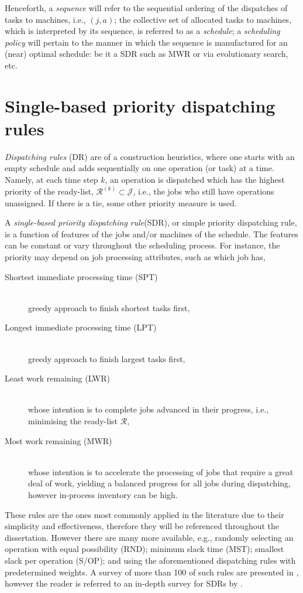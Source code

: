 Henceforth, a \emph{sequence} will refer to the sequential ordering of the dispatches of tasks to machines, i.e., $(j,a)$; the collective set of allocated tasks to machines, which is interpreted by its sequence, is referred to as a \emph{schedule}; a \emph{scheduling policy} will pertain to the manner in which the sequence is manufactured for an (near) optimal schedule: be it a SDR such as MWR or via evolutionary search, etc. 

\section{Single-based priority dispatching rules}\label{sec:SDR}
\emph{Dispatching rules} (DR) are of a construction heuristics, where one starts with an empty schedule and adds sequentially on one operation (or task) at a time. Namely, at each time step $k$, an operation is dispatched which has the highest priority of the ready-list, \mbox{$\mathcal{R}^{(k)}\subset\mathcal{J}$}, i.e., the jobs who still have operations unassigned. If there is a tie, some other priority measure is used. 

A \emph{single-based priority dispatching rule}(SDR), or simple priority dispatching rule, is a function of features of the jobs and/or machines of the schedule. The features can be constant or vary throughout the scheduling process. For instance, the priority may depend on job processing attributes, such as which job has, 
\begin{description}
\item[Shortest immediate processing time (SPT)] \hfill \\
greedy approach to finish shortest tasks first,  
\item[Longest immediate processing time (LPT)] \hfill \\
greedy approach to finish largest tasks first, 
\item[Least work remaining (LWR)] \hfill \\
whose intention is to complete jobs advanced in their pro\-gress, i.e., minimising the ready-list $\mathcal{R}$,
\item[Most work remaining (MWR)] \hfill \\
whose intention is to accelerate the processing of jobs that require a great deal of work, yielding a balanced progress for all jobs during dispatching, however in-process inventory can be high.
\end{description}
These rules are the ones most commonly applied in the literature due to their simplicity and effectiveness, %
therefore they will be referenced throughout the dissertation. 
However there are many more available, e.g., randomly selecting an operation with equal possibility (RND); minimum slack time (MST); smallest slack per operation (S/OP); and using the aforementioned dispatching rules with predetermined weights. A survey of more than 100 of such rules are presented in \citet{Panwalkar77}, however the reader is referred to an in-depth survey for SDRs by \citet{Haupt89}. 

